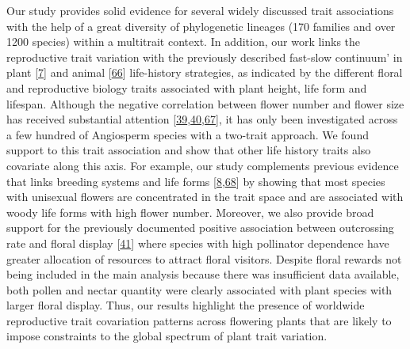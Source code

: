 \documentclass[
  12pt,
  a4paper,
]{article}
\begin{document}
Our study provides solid evidence for several widely discussed trait associations with the help of a great diversity of phylogenetic lineages (170 families and over 1200 species) within a multitrait context. In addition, our work links the reproductive trait variation with the previously described fast-slow continuum' in plant {[}\protect\hyperlink{ref-salguero2016}{7}{]} and animal {[}\protect\hyperlink{ref-healy2019}{66}{]} life-history strategies, as indicated by the different floral and reproductive biology traits associated with plant height, life form and lifespan. Although the negative correlation between flower number and flower size has received substantial attention {[}\protect\hyperlink{ref-sargent2007}{39},\protect\hyperlink{ref-kettle2011}{40},\protect\hyperlink{ref-worley2000}{67}{]}, it has only been investigated across a few hundred of Angiosperm species with a two-trait approach. We found support to this trait association and show that other life history traits also covariate along this axis. For example, our study complements previous evidence that links breeding systems and life forms {[}\protect\hyperlink{ref-friedman2020}{8},\protect\hyperlink{ref-petit2006}{68}{]} by showing that most species with unisexual flowers are concentrated in the trait space and are associated with woody life forms with high flower number. Moreover, we also provide broad support for the previously documented positive association between outcrossing rate and floral display {[}\protect\hyperlink{ref-goodwillie2010}{41}{]} where species with high pollinator dependence have greater allocation of resources to attract floral visitors. Despite floral rewards not being included in the main analysis because there was insufficient data available, both pollen and nectar quantity were clearly associated with plant species with larger floral display. Thus, our results highlight the presence of worldwide reproductive trait covariation patterns across flowering plants that are likely to impose constraints to the global spectrum of plant trait variation.
\end{document}
